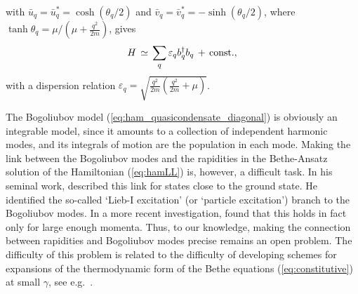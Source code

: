 \documentclass[onecolumn,amsfonts,showpacs,superscriptaddress]{revtex4-1}
\begin{document}
with $\bar{u}_q = \bar{u}_q^* = \cosh (\theta_q/2)$ and $\bar{v}_q = \bar{v}^*_q = -\sinh (\theta_q/2)$, where
$\tanh \theta_q = \mu/(\mu + \frac{q^2}{2m})$, gives
\begin{equation}
    \label{eq:ham_quasicondensate_diagonal}
 H  \, \simeq \, \sum_q \varepsilon_q b_q^\dagger b_q \,+\, {\rm const.},
\end{equation}
with a dispersion relation $\varepsilon_q = \sqrt{\frac{q^2}{2m} \left( \frac{q^2}{2m} + \mu \right)}$.


The Bogoliubov model (\ref{eq:ham_quasicondensate_diagonal}) is obviously an integrable model, since it amounts to a collection of independent harmonic modes, and its integrals of motion are the population in each mode.  Making the link between the Bogoliubov modes and the rapidities in the Bethe-Ansatz solution of the Hamiltonian (\ref{eq:hamLL}) is, however, a difficult task. In his seminal work, \cite{lieb_exact_1963} described this link for states close to the ground state. He identified 
the so-called `Lieb-I excitation' (or `particle excitation') branch to the Bogoliubov modes. In a more recent investigation, \cite{ristivojevic_excitation_2014} found that this holds in fact only for large enough momenta. Thus, to our knowledge, making the connection between rapidities and Bogoliubov modes precise remains an open problem. The difficulty of this problem is related to the difficulty of developing schemes for expansions of the thermodynamic form of the Bethe equations (\ref{eq:constitutive}) at small $\gamma$, see e.g.~\citep{takahashi1975validity,popov1977theory,lang2017ground,prolhac2017ground,marino2019exact}.
\end{document}
